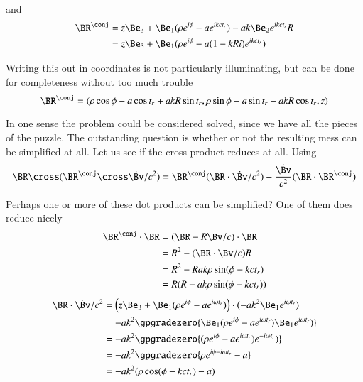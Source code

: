 {and
%
\begin{equation}\label{eqn:relativisticElectrodynamicsExamReflection:1090}
\begin{aligned}
\BR^\conj
&=
z \Be_3 + \Be_1 (\rho e^{i \phi} - a e^{i k c t_r} )
-
a k \Be_2 e^{i k c t_r} R \\
&=
z \Be_3 + \Be_1 (\rho e^{i \phi} - a (1 - k R i) e^{i k c t_r} )
\end{aligned}
\end{equation}

Writing this out in coordinates is not particularly illuminating, but can be done for completeness without too much trouble
%
\begin{equation}\label{eqn:relativisticElectrodynamicsExamReflection:600}
\BR^\conj =
( \rho \cos\phi - a \cos t_r + a k R \sin t_r,
  \rho \sin\phi - a \sin t_r - a k R \cos t_r,
  z )
\end{equation}

In one sense the problem could be considered solved, since we have all the pieces of the puzzle.  The outstanding question is whether or not the resulting mess can be simplified at all.  Let us see if the cross product reduces at all.  Using
%
\begin{equation}\label{eqn:relativisticElectrodynamicsExamReflection:620}
\BR \cross (\BR^\conj \cross \dot{\Bv}/c^2)
=
\BR^\conj (\BR \cdot \dot{\Bv}/c^2)
- \frac{\dot{\Bv}}{c^2}
(\BR \cdot \BR^\conj)
\end{equation}

Perhaps one or more of these dot products can be simplified?  One of them does reduce nicely
%
\begin{equation}\label{eqn:relativisticElectrodynamicsExamReflection:1110}
\begin{aligned}
\BR^\conj \cdot \BR
&= ( \BR - R \Bv/c ) \cdot \BR  \\
&= R^2 - (\BR \cdot \Bv/c) R \\
&= R^2 - R a k \rho \sin(\phi - k c t_r) \\
&= R(R - a k \rho \sin(\phi - k c t_r))
\end{aligned}
\end{equation}
%
\begin{equation}\label{eqn:relativisticElectrodynamicsExamReflection:1130}
\begin{aligned}
\BR \cdot \dot{\Bv}/c^2
&=
\Bigl(z \Be_3 + \Be_1 (\rho e^{i \phi} - a e^{i \omega t_r} ) \Bigr) \cdot
(-a k^2 \Be_1 e^{i \omega t_r} )  \\
&=
- a k^2 \gpgradezero{
\Be_1 (\rho e^{i \phi} - a e^{i \omega t_r} )
\Be_1 e^{i \omega t_r} )
} \\
&=
- a k^2 \gpgradezero{
(\rho e^{i \phi} - a e^{i \omega t_r} )
e^{-i \omega t_r} )
} \\
&=
- a k^2 \gpgradezero{
\rho e^{i \phi - i \omega t_r} - a
} \\
&=
- a k^2 ( \rho \cos(\phi - k c t_r) - a )
\end{aligned}
\end{equation}

}
